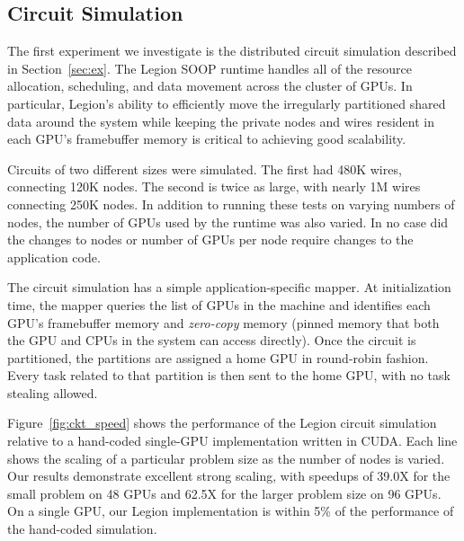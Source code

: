 \subsection{Circuit Simulation}
\label{subsec:exp_ckt}

The first experiment we investigate is the distributed circuit simulation described in 
Section~\ref{sec:ex}.  The Legion SOOP runtime handles all of the resource allocation, 
scheduling, and data movement across the cluster of GPUs.  In particular,  
Legion's ability to efficiently move the irregularly partitioned
shared data around the system while keeping the private nodes and wires resident in
each GPU's framebuffer memory is critical to achieving good scalability.

Circuits of two different sizes were simulated.  The first had 480K wires, connecting
120K nodes.  The second is twice as large, with nearly 1M wires connecting 
250K nodes.  In addition to running these tests on varying numbers of
nodes, the number of GPUs used by the runtime was also varied.  In no case did the 
changes to nodes or number of GPUs per node require changes to the application code.

The circuit simulation has a simple application-specific mapper.  At initialization
time, the mapper queries the list of GPUs in the machine and identifies each GPU's
framebuffer memory and {\em zero-copy} memory (pinned memory that both the GPU and
CPUs in the system can access directly).  Once the circuit is partitioned, the partitions
are assigned a home GPU in round-robin fashion.  Every task related to that partition is
then sent to the home GPU, with no task stealing allowed.  
%
%
%

Figure~\ref{fig:ckt_speed} shows the performance of the Legion circuit simulation relative
to a hand-coded single-GPU implementation written in CUDA.  Each line shows the scaling of
a particular problem size as the number of nodes is varied.  Our results demonstrate
excellent strong scaling, with speedups of 39.0X for the small problem on 48 GPUs and 
62.5X for the larger problem size on 96 GPUs.  On a single GPU, our Legion implementation
is within 5\% of the performance of the hand-coded simulation.

